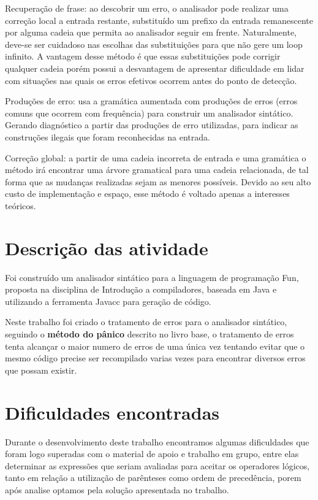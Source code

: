 \documentclass[
	article,			%
	11pt,				%
	oneside,			%
	a4paper,			%
	portuguese,			%
	brazil,				%
	sumario=tradicional
	]{abntex2}
\begin{document}
Recuperação de frase: ao descobrir um erro, o analisador pode realizar uma correção local a entrada restante, substituído um prefixo da entrada remanescente por alguma cadeia que permita ao analisador seguir em frente. Naturalmente, deve-se ser cuidadoso nas escolhas das substituições para que não gere um loop infinito. A vantagem desse método é que essas  substituições pode corrigir qualquer cadeia porém possui a desvantagem de apresentar dificuldade em lidar com situações nas quais os erros efetivos ocorrem antes do ponto de detecção.  

Produções de erro: usa a gramática aumentada com produções de erros (erros comuns que ocorrem com frequência) para construir um analisador sintático. Gerando diagnóstico a partir das produções de erro utilizadas, para indicar as construções ilegais que foram reconhecidas na entrada. 

Correção global: a partir de uma cadeia incorreta de entrada e uma gramática o método irá encontrar uma árvore gramatical para uma cadeia relacionada, de tal forma que as mudanças realizadas sejam as menores possíveis. Devido ao seu alto custo de implementação e espaço, esse método é voltado apenas a interesses teóricos.

\section{Descrição das atividade}

Foi construído um analisador sintático para a linguagem de programação Fun, proposta na disciplina de Introdução a compiladores, baseada em Java e utilizando a 
ferramenta Javacc para geração de código.

Neste trabalho foi criado o tratamento de erros para o analisador sintático, seguindo o \textbf{método do pânico} descrito no livro base, o tratamento de erros tenta alcançar o maior numero de erros de uma única vez tentando evitar que o mesmo código precise ser recompilado varias vezes para encontrar diversos erros que possam existir.
 
\section{Dificuldades encontradas}

Durante o desenvolvimento deste trabalho encontramos algumas dificuldades que foram logo superadas com o material de apoio e trabalho em grupo, entre elas determinar as expressões que seriam avaliadas para aceitar os operadores lógicos, tanto em relação a utilização de parênteses como ordem de precedência, porem após analise optamos pela solução apresentada no trabalho.
\end{document}
